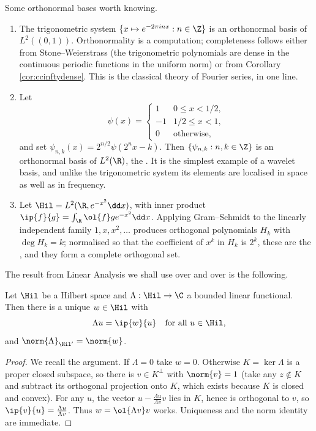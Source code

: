 \begin{example}\label{ex:onb}
	Some orthonormal bases worth knowing.
	\begin{enumerate}[label=(\roman*)]
		\item The trigonometric system $\{x \mapsto e^{-2\pi i n x} : n \in \Z\}$ is an orthonormal basis of $L^2((0,1))$. Orthonormality is a computation; completeness follows either from Stone--Weierstrass (the trigonometric polynomials are dense in the continuous periodic functions in the uniform norm) or from Corollary \ref{cor:ccinftydense}. This is the classical theory of Fourier series, in one line.
		\item Let
		$$\psi(x) = \begin{cases} 1 & 0 \le x < 1/2, \\ -1 & 1/2 \le x < 1, \\ 0 & \text{otherwise},\end{cases}$$
		and set $\psi_{n,k}(x) = 2^{n/2}\psi(2^n x - k)$. Then $\{\psi_{n,k} : n, k \in \Z\}$ is an orthonormal basis of $L^2(\R)$, the . It is the simplest example of a wavelet basis, and unlike the trigonometric system its elements are localised in space as well as in frequency.
		\item Let $\Hil = L^2(\R, e^{-x^2}\dd x)$, with inner product $\ip{f}{g} = \int_\R \ol{f} g e^{-x^2} \dd x$. Applying Gram--Schmidt to the linearly independent family $1, x, x^2, \dots$ produces orthogonal polynomials $H_k$ with $\deg H_k = k$; normalised so that the coefficient of $x^k$ in $H_k$ is $2^k$, these are the , and they form a complete orthogonal set.
	\end{enumerate}
\end{example}

The result from Linear Analysis we shall use over and over is the following.

\begin{theorem}\label{thm:rieszhilbert}
	Let $\Hil$ be a Hilbert space and $\Lambda : \Hil \to \C$ a bounded linear functional. Then there is a unique $w \in \Hil$ with
	$$\Lambda u = \ip{w}{u} \quad \text{for all } u \in \Hil,$$
	and $\norm{\Lambda}_{\Hil'} = \norm{w}$.
\end{theorem}

\begin{proof}
	We recall the argument. If $\Lambda = 0$ take $w = 0$. Otherwise $K = \ker \Lambda$ is a proper closed subspace, so there is $v \in K^\perp$ with $\norm{v} = 1$ (take any $z \notin K$ and subtract its orthogonal projection onto $K$, which exists because $K$ is closed and convex). For any $u$, the vector $u - \frac{\Lambda u}{\Lambda v} v$ lies in $K$, hence is orthogonal to $v$, so $\ip{v}{u} = \frac{\Lambda u}{\Lambda v}$. Thus $w = \ol{\Lambda v} v$ works. Uniqueness and the norm identity are immediate.
\end{proof}

